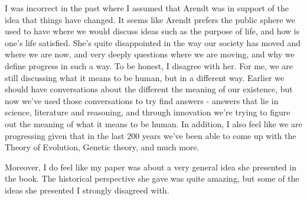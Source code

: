 \documentclass[11pt, oneside]{article}
\begin{document}
\par I was incorrect in the past where I assumed that Arendt was in support of the idea that things have changed. It seems like Arendt prefers the public sphere we used to have where we would discuss ideas such as the purpose of life, and how is one's life satisfied. She's quite disappointed in the way our society has moved and where we are now, and very deeply questions where we are moving, and why we define progress in such a way. To be honest, I disagree with her. For me, we are still discussing what it means to be human, but in a different way. Earlier we should have conversations about the different the meaning of our existence, but now we've used those conversations to try find answers - answers that lie in science, literature and reasoning, and through innovation we're trying to figure out the meaning of what it means to be human. In addition, I also feel like we are progressing given that in the last 200 years we've been able to come up with the Theory of Evolution, Genetic theory, and much more. 

\par Moreover, I do feel like my paper was about a very general idea she presented in the book. The historical perspective she gave was quite amazing, but some of the ideas she presented I strongly disagreed with.
\end{document}

